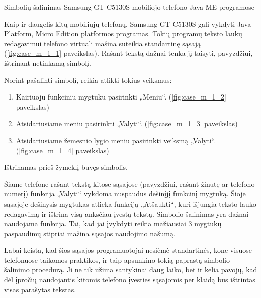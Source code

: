 \begin{xcase}{Simbolių šalinimas Samsung GT-C5130S mobiliojo telefono
              Java ME programose}
  \xcgoal
  {
    Kaip ir daugelis kitų mobiliųjų telefonų, Samsung GT-C5130S gali vykdyti
    Java Platform, Micro Edition platformos programas. Tokių programų
    teksto laukų redagavimui telefono virtuali mašina suteikia standartinę
    sąsają (\ref{fig:case_m_1_1} paveikslas). Rašant tekstą dažnai tenka jį
    taisyti, pavyzdžiui, ištrinant  netinkamą simbolį.

  }
  
  \xctools
  {
    Norint pašalinti simbolį, reikia atlikti tokius veiksmus:
    \begin{enumerate}
      \item Kairiuoju funkciniu mygtuku pasirinkti „Meniu“.
        (\ref{fig:case_m_1_2} paveikslas)
      \item Atsidariusiame meniu pasirinkti „Valyti“.
        (\ref{fig:case_m_1_3} paveikslas)
      \item Atsidariusiame žemesnio lygio meniu pasirinkti veiksmą „Valyti“.
        (\ref{fig:case_m_1_4} paveikslas)
    \end{enumerate}

    {
    }
  }
  
  \xcresult
  {
    Ištrinamas prieš žymeklį buvęs simbolis.
  }
  
  \xcprinciples
  {
    {
      Šiame telefone rašant tekstą kitose sąsajose (pavyzdžiui, rašant
      žinutę ar telefono numerį) funkcija „Valyti“ vykdoma nuspaudus
      dešinįjį funkcinį mygtuką. Šioje sąsajoje dešinysis mygtukas atlieka
      funkciją „Atšaukti“, kuri išjungia teksto lauko redagavimą ir
      ištrina visą anksčiau įvestą tekstą.
    }
    {
      Simbolio šalinimas yra dažnai naudojama funkcija. Tai, kad jai
      įvykdyti reikia mažiausiai 3 mygtukų paspaudimų stipriai mažina
      sąsajos naudojimo našumą.
    }
  }
  
  \xcthoughts
  {
    Labai keista, kad šios sąsajos programuotojai nesiėmė standartinės, kone
    visuose telefonuose taikomos praktikos, ir taip apsunkino tokią paprastą
    simbolio šalinimo procedūrą. Ji ne tik užima santykinai daug laiko, bet
    ir kelia pavojų, kad dėl įpročių naudojantis kitomis telefono įvesties
    sąsajomis per klaidą bus ištrintas visas parašytas tekstas.
  }
\end{xcase}
